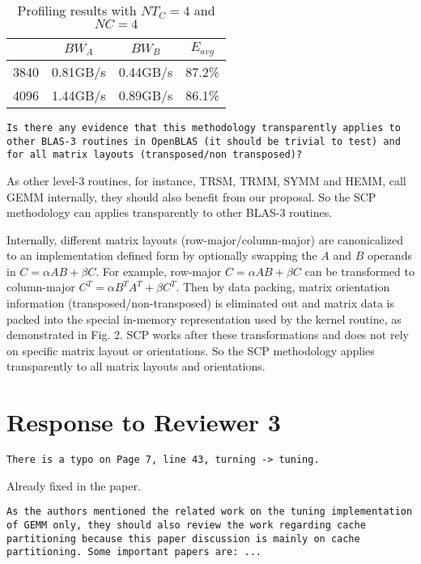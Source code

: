 \documentclass[]{article}
\begin{document}
\begin{table}[h]
  \centering
  \caption{Profiling results with $NT_C=4$ and $NC=4$}
  \vspace{1em}
  \begin{tabular}{cccc}
    \toprule
         & $BW_A$   & $BW_B$   & $E_{avg}$\\
    \midrule
    3840 & 0.81GB/s & 0.44GB/s & 87.2\%   \\
    4096 & 1.44GB/s & 0.89GB/s & 86.1\%   \\
    \bottomrule
  \end{tabular}
\end{table}

\begin{verbatim}
Is there any evidence that this methodology transparently applies to 
other BLAS-3 routines in OpenBLAS (it should be trivial to test) and
for all matrix layouts (transposed/non transposed)?
\end{verbatim}

As other level-3 routines, for instance, TRSM, TRMM, SYMM and HEMM,
call GEMM internally, they should also benefit from our proposal.
So the SCP methodology can applies transparently to other BLAS-3 routines.

Internally, different matrix layouts (row-major/column-major)
are canonicalized to an implementation defined form
by optionally swapping the $A$ and $B$ operands in $C=\alpha A B+\beta C$.
For example, row-major $C=\alpha A B+\beta C$ can be transformed to
column-major $C^T=\alpha B^T A^T + \beta C^T$.
Then by data packing, matrix orientation information (transposed/non-transposed)
is eliminated out and matrix data is packed into the special
in-memory representation used by the kernel routine, as demonstrated in Fig. 2.
SCP works after these transformations and does not rely on
specific matrix layout or orientations.
So the SCP methodology applies transparently to
all matrix layouts and orientations.

\section{Response to Reviewer 3}

\begin{verbatim}
There is a typo on Page 7, line 43, turning -> tuning.
\end{verbatim}

Already fixed in the paper.

\begin{verbatim}
As the authors mentioned the related work on the tuning implementation
of GEMM only, they should also review the work regarding cache 
partitioning because this paper discussion is mainly on cache
partitioning. Some important papers are: ...
\end{verbatim}
\end{document}
